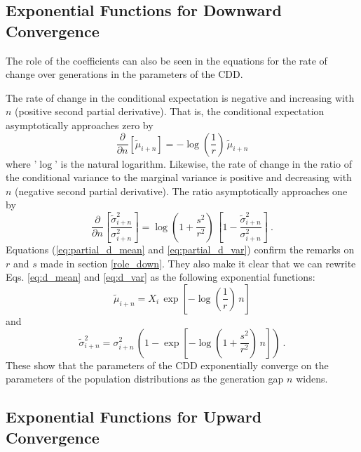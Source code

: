 \documentclass{svproc} %
\begin{document}
\subsection{Exponential Functions for Downward Convergence}

The role of the coefficients can also be seen in the equations for the rate of change over generations in the parameters of the CDD. 

The rate of change in the conditional expectation is negative and increasing with $n$ (positive second partial derivative). That is, the conditional expectation asymptotically approaches zero by 
\begin{equation}
\frac{\partial }{\partial n}[\tilde{\mu}_{i+n}] = -\log(\frac{1}{r}) \, \tilde{\mu}_{i+n}
\label{eq:partial_d_mean}
\end{equation}
where '$\log$' is the natural logarithm. Likewise, the rate of change in the ratio of the conditional variance to the marginal variance is positive and decreasing with $n$ (negative second partial derivative). The ratio asymptotically approaches one by 
\begin{equation}
\frac{\partial }{\partial n}[\frac{\tilde{\sigma}_{i+n}^2}{\sigma_{i+n}^2}] = \log(1+\frac{s^2}{r^2}) \, [1 - \frac{\tilde{\sigma}_{i+n}^2}{\sigma_{i+n}^2}] \ .
\label{eq:partial_d_var}
\end{equation}
Equations (\ref{eq:partial_d_mean} and \ref{eq:partial_d_var}) confirm the remarks on $r$ and $s$ made in section \ref{role_down}. They also make it clear that we can rewrite Eqs. \ref{eq:d_mean} and \ref{eq:d_var} as the following exponential functions:
\begin{equation}
\tilde{\mu}_{i+n} = X_i \, \exp[-\log(\frac{1}{r}) \, n]
\label{eq:expo_d_mean}
\end{equation}
and 
\begin{equation}
\tilde{\sigma}_{i+n}^2 = \sigma_{i+n}^2 \, (1 - \exp[-\log(1+\frac{s^2}{r^2}) \, n]) \ .
\label{eq:expo_d_var}
\end{equation}
These show that the parameters of the CDD exponentially converge on the parameters of the population distributions as the generation gap $n$ widens. 


\subsection{Exponential Functions for Upward Convergence}
\end{document}
